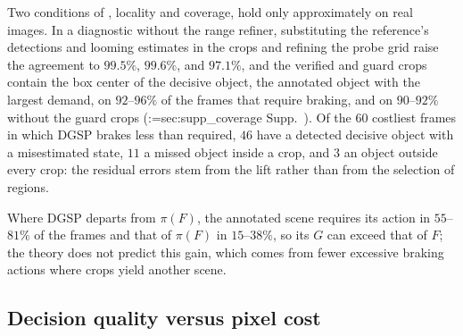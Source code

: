 \documentclass[10pt,twocolumn,letterpaper]{article}
\makeatletter
\newcommand{\method}{DGSP\xspace}
\newcommand{\full}{F}             %
\newcommand{\policy}{\pi}         %
\newcommand{\G}{G}                %
\theoremstyle{definition}
\theoremstyle{remark}
\DeclareRobustCommand{\supp}[1]{\def\supp@list{}\@for\supp@i:=#1\do{\ifx\supp@list\@empty\edef\supp@list{S-\supp@i}\else\edef\supp@list{\supp@list,S-\supp@i}\fi}%
\edef\supp@cmd{\noexpand\Cref*{\supp@list}}Supp.~\supp@cmd}
\makeatother
\begin{document}
Two conditions of , locality and coverage, hold only approximately on real images.
In a diagnostic without the range refiner, substituting the reference's detections and looming estimates in the crops and refining the probe grid raise the agreement to $99.5\%$, $99.6\%$, and $97.1\%$, and the verified and guard crops contain the box center of the decisive object, the annotated object with the largest demand, on $92$--$96\%$ of the frames that require braking, and on $90$--$92\%$ without the guard crops (\supp{sec:supp_coverage}).
Of the $60$ costliest frames in which \method brakes less than required, $46$ have a detected decisive object with a misestimated state, $11$ a missed object inside a crop, and $3$ an object outside every crop: the residual errors stem from the lift rather than from the selection of regions.

Where \method departs from $\policy(\full)$, the annotated scene requires its action in $55$--$81\%$ of the frames and that of $\policy(\full)$ in $15$--$38\%$, so its $\G$ can exceed that of $\full$; the theory does not predict this gain, which comes from fewer excessive braking actions where crops yield another scene.

\subsection{Decision quality versus pixel cost}
\label{sec:exp_main}
\label{sec:exp_adaptive}
\end{document}
